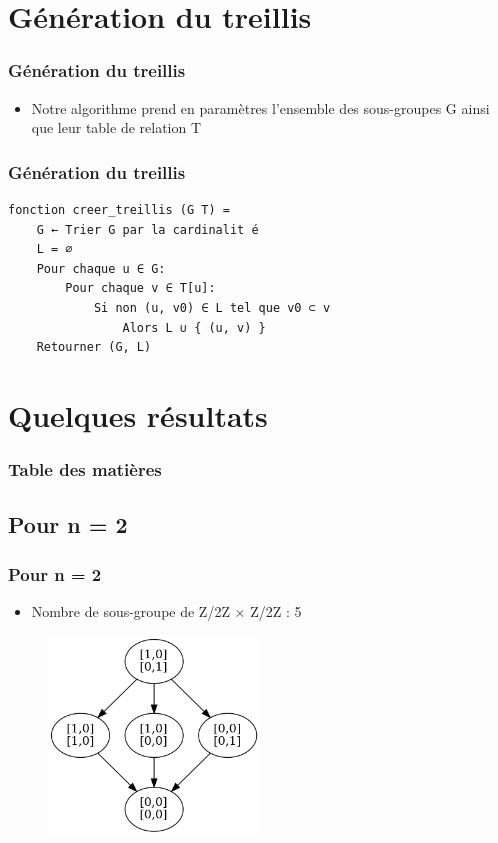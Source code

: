 \documentclass{beamer}
\begin{document}
\section{Génération du treillis}
\begin{frame}
\frametitle{Génération du treillis}
\tableofcontents[currentsection]
\end{frame}

\begin{frame}[fragile]
\begin{itemize}
    \item Notre algorithme prend en paramètres l’ensemble des sous-groupes G ainsi que leur table
de relation T
\end{itemize}
\frametitle{Génération du treillis}
\begin{verbatim}
fonction creer_treillis (G T) =
    G ← Trier G par la cardinalit é
    L = ∅
    Pour chaque u ∈ G:
        Pour chaque v ∈ T[u]:
            Si non (u, v0) ∈ L tel que v0 ⊂ v
                Alors L ∪ { (u, v) }
    Retourner (G, L)
\end{verbatim}
\end{frame}


\section{Quelques résultats}
\begin{frame}
\frametitle{Table des matières}
\tableofcontents[currentsection]
\end{frame}


\subsection{Pour n = 2}
\begin{frame}
\frametitle{Pour n = 2}
\begin{itemize}
    \item Nombre de sous-groupe de Z/2Z × Z/2Z : 5
\end{itemize}
\begin{figure}
  \centering
  \includegraphics[width=0.5\textwidth]{Z2ZxZ2Z.png}
\end{figure}
\end{frame}
\end{document}
